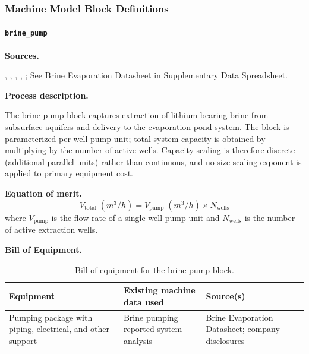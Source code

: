 \clearpage
\subsubsection{Machine Model Block Definitions}\label{app:04-methods-blockdefs}


\paragraph{\texttt{brine\_pump}}\label{app:04-methods-blockdefs-brinepump}

\medskip
\noindent\textbf{Sources.}\quad

\citet{srkconsultingSECTechnicalReport2023a}, \citet{becerraTechnicalReportSummary2024}, \citet{srkconsultingSECTechnicalReport2022}, \citet{montgomeryassociatesconsultoreslimitadaSECTechnicalReport2023}, \citet{brookerSECTechnicalReport2023};
See Brine Evaporation Datasheet in Supplementary Data Spreadsheet. 

\medskip
\noindent\textbf{Process description.}\quad

The brine pump block captures extraction of lithium-bearing brine from subsurface aquifers and delivery to the evaporation pond system. The block is parameterized per well-pump unit; total system capacity is obtained by multiplying by the number of active wells. Capacity scaling is therefore discrete (additional parallel units) rather than continuous, and no size-scaling exponent is applied to primary equipment cost.

\medskip
\noindent\textbf{Equation of merit.}\quad
\[
  \dot{V}_\text{total}\;(\si{m^3/h}) = \dot{V}_\text{pump}\;(\si{m^3/h}) \times N_\text{wells}
\]
where $\dot{V}_\text{pump}$ is the flow rate of a single well-pump unit and $N_\text{wells}$ is the number of active extraction wells.

\medskip
\noindent\textbf{Bill of Equipment.}\quad

\begin{table}[h!]
\caption{Bill of equipment for the brine pump block.}
\label{tab:c-equip-evappond}
\centering
\begin{tabular}{>{\raggedright\arraybackslash}p{5.2cm}
                >{\raggedright\arraybackslash}p{4cm}
                >{\raggedright\arraybackslash}p{4.5cm}}
\toprule
\textbf{Equipment} & \textbf{Existing machine data used} & \textbf{Source(s)} \\
\midrule
Pumping package with piping, electrical, and other support & Brine pumping reported system analysis & Brine Evaporation Datasheet; company disclosures \\
\bottomrule
\end{tabular}
\end{table}

